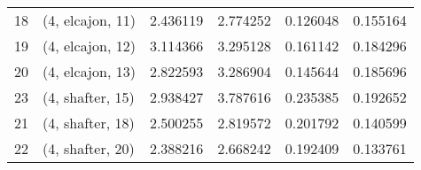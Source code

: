 \begin{tabular}{llrrrr}
18 &  (4, elcajon, 11) &   2.436119 &   2.774252 &   0.126048 &  0.155164 \\
19 &  (4, elcajon, 12) &   3.114366 &   3.295128 &   0.161142 &  0.184296 \\
20 &  (4, elcajon, 13) &   2.822593 &   3.286904 &   0.145644 &  0.185696 \\
23 &  (4, shafter, 15) &   2.938427 &   3.787616 &   0.235385 &  0.192652 \\
21 &  (4, shafter, 18) &   2.500255 &   2.819572 &   0.201792 &  0.140599 \\
22 &  (4, shafter, 20) &   2.388216 &   2.668242 &   0.192409 &  0.133761 \\
\bottomrule
\end{tabular}
